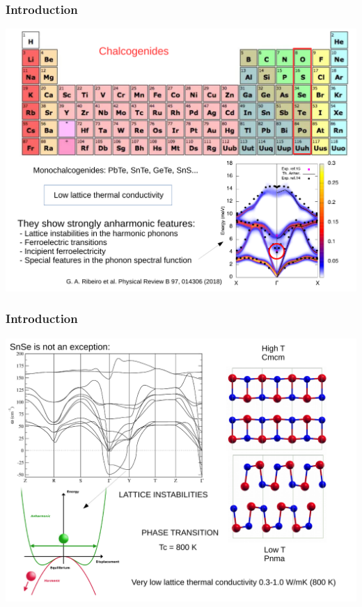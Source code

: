 \documentclass{beamer}
\begin{document}
\begin{frame}

\frametitle{Introduction}
\vspace{-0.5cm}
\begin{center}
\includegraphics[width=0.85\linewidth]{Pictures/INTRO/chalcogenides.pdf}
\end{center}

\end{frame}

\begin{frame}

\frametitle{Introduction}
\vspace{-0.5cm}
\begin{center}
\includegraphics[width=0.85\linewidth]{Pictures/INTRO/SnSeIntro.pdf}
\end{center}

\end{frame}
\end{document}
